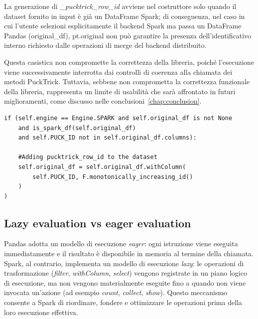 \documentclass[../main.tex]{subfiles}
\begin{document}
\label{subsection:problemaIDOriginalDF}
La generazione di \textit{\_pucktrick\_row\_id} avviene nel costruttore solo quando il dataset fornito in input è già un DataFrame Spark; di conseguenza, nel caso in cui l’utente selezioni esplicitamente il backend Spark ma passa un DataFrame Pandas (original\_df), pt.original non può garantire la presenza dell’identificativo interno richiesto dalle operazioni di merge del backend distribuito.

Questa casistica non compromette la correttezza della libreria, poiché l’esecuzione viene successivamente interrotta dai controlli di coerenza alla chiamata dei metodi PuckTrick. Tuttavia, sebbene non comprometta la correttezza funzionale della libreria, rappresenta un limite di usabilità che sarà affrontato in futuri miglioramenti, come discusso nelle conclusioni~\ref{chap:conclusion}.

\begin{listing}[H]
\begin{verbatim}
if (self.engine == Engine.SPARK and self.original_df is not None
    and is_spark_df(self.original_df)
    and self.PUCK_ID not in self.original_df.columns):

    #Adding pucktrick_row_id to the dataset
    self.original_df = self.original_df.withColumn(
        self.PUCK_ID, F.monotonically_increasing_id()
    )
)
\end{verbatim}
\caption{Aggiunta dell'identificativo univoco di riga nel costruttore di 
\textit{PuckTrick}. La colonna viene creata una sola volta, riutilizzata 
da tutti i metodi internamente e rimossa prima della restituzione 
del dataset all'utente.}
\label{lst:pucktrick_row_id}
\end{listing}


\subsection{Lazy evaluation vs eager evaluation}

Pandas adotta un modello di esecuzione \textit{eager}: ogni istruzione viene eseguita immediatamente e il risultato è disponibile in memoria al termine della chiamata. Spark, al contrario, implementa un modello di esecuzione \textit{lazy}: le operazioni di trasformazione (\textit{filter}, \textit{withColumn}, \textit{select}) vengono registrate in un piano logico di esecuzione, ma non vengono materialmente eseguite fino a quando non viene invocata un'azione (ad esempio \textit{count}, \textit{collect}, \textit{show}). Questo meccanismo consente a Spark di riordinare, fondere e ottimizzare le operazioni prima della loro esecuzione effettiva.
\end{document}
